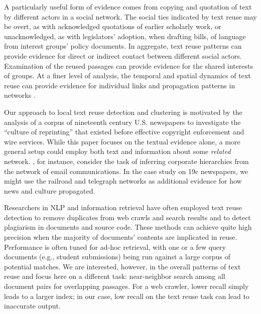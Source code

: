 \documentclass[pdftex,11pt]{article}
\begin{document}
A particularly useful form of evidence comes from copying and
quotation of text by different actors in a social network.  The social
ties indicated by text reuse may be overt, as with acknowledged
quotations of earlier scholarly work, or unacknowledged, as with
legislators' adoption, when drafting bills, of language from interest
groups' policy documents.  In aggregate, text reuse patterns can
provide evidence for direct or indirect contact between different
social actors.  Examination of the reused passages can provide
evidence for the shared interests of groups.  At a finer level of
analysis, the temporal and spatial dynamics of text reuse can provide
evidence for individual links and propagation patterns in networks
\citep{leskovec09:_meme_dynam_news_cycle,lease12:_findin_explor_memes_social_media}.

Our approach to local text reuse detection and clustering is motivated
by the analysis of a corpus of nineteenth century U.S. newspapers to
investigate the ``culture of reprinting'' that existed before
effective copyright enforcement and wire services.  While this paper
focuses on the textual evidence alone, a more general setup could
employ both text and information about some \emph{related} network.
\citet{namata11:_collec_graph_ident}, for instance, consider the
task of inferring corporate hierarchies from the network of email
communications.  In the case study on 19c newspapers, we might use the
railroad and telegraph networks as additional evidence for how news
and culture propagated.

Researchers in NLP and information retrieval have often employed text
reuse detection to remove duplicates from web crawls and search
results and to detect plagiarism in documents and source code.  These
methods can achieve quite high precision when the majority of
documents' contents are implicated in reuse.  Performance is often
tuned for ad-hoc retrieval, with one or a few query documents (e.g.,
student submissions) being run against a large corpus of potential
matches.  We are interested, however, in the overall patterns of text
reuse and focus here on a different task: near-neighbor search among
all document pairs for overlapping passages.  For a web crawler, lower
recall simply leads to a larger index; in our case, low recall on the
text reuse task can lead to inaccurate output.
\end{document}
